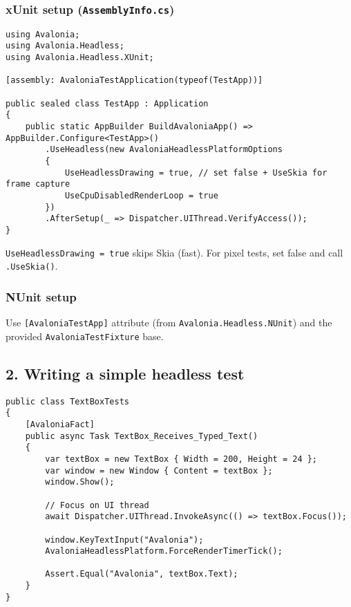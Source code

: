 \subsubsection{\texorpdfstring{xUnit setup
(\texttt{AssemblyInfo.cs})}{xUnit setup (AssemblyInfo.cs)}}\label{xunit-setup-assemblyinfo.cs}

\begin{lstlisting}
using Avalonia;
using Avalonia.Headless;
using Avalonia.Headless.XUnit;

[assembly: AvaloniaTestApplication(typeof(TestApp))]

public sealed class TestApp : Application
{
    public static AppBuilder BuildAvaloniaApp() => AppBuilder.Configure<TestApp>()
        .UseHeadless(new AvaloniaHeadlessPlatformOptions
        {
            UseHeadlessDrawing = true, // set false + UseSkia for frame capture
            UseCpuDisabledRenderLoop = true
        })
        .AfterSetup(_ => Dispatcher.UIThread.VerifyAccess());
}
\end{lstlisting}

\passthrough{\lstinline!UseHeadlessDrawing = true!} skips Skia (fast).
For pixel tests, set false and call
\passthrough{\lstinline!.UseSkia()!}.

\subsubsection{NUnit setup}\label{nunit-setup}

Use \passthrough{\lstinline![AvaloniaTestApp]!} attribute (from
\passthrough{\lstinline!Avalonia.Headless.NUnit!}) and the provided
\passthrough{\lstinline!AvaloniaTestFixture!} base.

\subsection{2. Writing a simple headless
test}\label{writing-a-simple-headless-test}

\begin{lstlisting}
public class TextBoxTests
{
    [AvaloniaFact]
    public async Task TextBox_Receives_Typed_Text()
    {
        var textBox = new TextBox { Width = 200, Height = 24 };
        var window = new Window { Content = textBox };
        window.Show();

        // Focus on UI thread
        await Dispatcher.UIThread.InvokeAsync(() => textBox.Focus());

        window.KeyTextInput("Avalonia");
        AvaloniaHeadlessPlatform.ForceRenderTimerTick();

        Assert.Equal("Avalonia", textBox.Text);
    }
}
\end{lstlisting}

